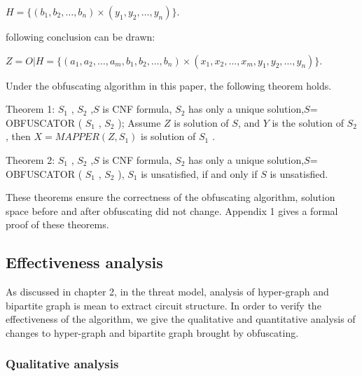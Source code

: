 \documentclass[runningheads,a4paper]{llncs}
\begin{document}
$H=\{(b_1,b_2,\dots,b_n)\times(y_1,y_2,\dots,y_n)\}$. 

following conclusion can be drawn:

$Z=O|H=\{(a_1,a_2,\dots,a_m,b_1,b_2,\dots,b_n)\times(x_1,x_2,\dots,x_m,y_1,y_2,\dots,y_n)\}$.

Under the obfuscating algorithm in this paper, the following theorem holds.


Theorem 1: $S_1$ , $S_2$ ,$S$ is CNF formula, $S_2$ has only a unique solution,$S$= OBFUSCATOR ( $S_1$ , $S_2$ ); 
 Assume $Z$ is solution of $S$, and $Y$ is the solution of $S_2$ , 
 then $X = MAPPER (Z, S_1)$ is solution of $S_1$ .

Theorem 2: $S_1$ , $S_2$ ,$S$ is CNF formula, $S_2$ has only a unique solution,$S$= OBFUSCATOR ( $S_1$ , $S_2$ ),
$S_1$  is unsatisfied, if and only if $S$ is unsatisfied.

These theorems ensure the correctness of the obfuscating algorithm, solution space before and after obfuscating did not change. Appendix 1 gives a formal proof of these theorems.
\subsection{Effectiveness analysis}

As discussed in chapter 2, in the threat model, analysis of hyper-graph and bipartite graph is mean to extract circuit structure. 
In order to verify the effectiveness of the algorithm, we give the qualitative and quantitative analysis of changes to hyper-graph and bipartite graph brought by obfuscating.
\subsubsection{Qualitative analysis}
\end{document}
